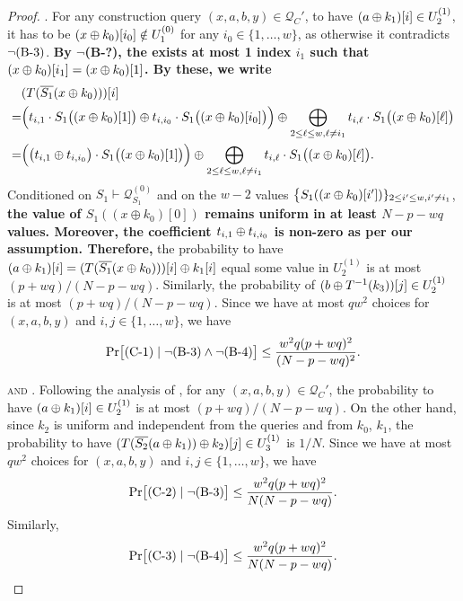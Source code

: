 \begin{proof}
\noindent \textsc{\cone}. For any construction query $(x,a,b,y)\in\mathcal{Q}_C'$, to have $(a\oplus k_1)[i]\in U_2^{(1)}$, it has to be $(x\oplus k_0)[i_0]\notin U_1^{(0)}$ for any $i_0\in\{1,\ldots,w\}$, as otherwise it contradicts $\neg\text{(B-3)}$. \textbf{By $\neg$(B-?), the exists at most 1 index $i_1$ such that $(x\oplus k_0)[i_1]=(x\oplus k_0)[1]$. By these, we write}
%
\begin{align*}
& (T(\overline{S_1}(x\oplus k_0)))[i]       \\
= &
\Big(t_{i,1}\cdot S_1\big((x\oplus k_0)[1]\big)
\oplus
t_{i,i_0}\cdot S_1\big((x\oplus k_0)[i_0]\big)\Big)
\oplus
\bigoplus_{2\leq\ell\leq w,\ell\neq i_1}t_{i,\ell}\cdot S_1\big((x\oplus k_0)[\ell]\big)     \\
= &
\Big(\big(t_{i,1}\oplus t_{i,i_0}\big)\cdot S_1\big((x\oplus k_0)[1]\big)\Big)
\oplus
\bigoplus_{2\leq\ell\leq w,\ell\neq i_1}t_{i,\ell}\cdot S_1\big((x\oplus k_0)[\ell]\big)    .
\end{align*}
%
Conditioned on $S_1\vdash\mathcal{Q}_{S_1}^{(0)}$ and on the $w-2$ values $\big\{S_1((x\oplus k_0)[i'])\}_{2\leq i'\leq w,i'\neq i_1}$, \textbf{the value of $S_1((x \oplus k_0)[0])$ remains uniform in at least $N-p-wq$ values. Moreover, the coefficient $t_{i,1}\oplus t_{i,i_0}$ is non-zero as per our assumption. Therefore,} the probability to have $(a\oplus k_1)[i]=(T(\overline{S_1}(x\oplus k_0)))[i]\oplus k_1[i]$ equal some value in $U_2^{(1)}$ is at most $(p+wq)/(N-p-wq)$. Similarly, the probability of $(b\oplus T^{-1}(k_3))[j]\in U_2^{(1)}$ is at most $(p+wq)/(N-p-wq)$. Since we have at most $qw^2$ choices for $(x,a,b,y)$ and $i, j \in\{1, \ldots, w\}$, we have
%
$$
{\Pr}\big[\text{(C-1)}\mid\neg\text{(B-3)}\wedge\neg\text{(B-4)}\big] \leq \frac{w^{2} q (p+w q)^{2}}{(N-p-wq)^{2}}.
$$




\noindent \textsc{\ctwo and \cthree}. Following the analysis of \cone, for any $(x,a,b,y)\in\mathcal{Q}_C'$, the probability to have $(a\oplus k_1)[i]\in U_{2}^{(1)}$ is at most $(p+wq)/(N-p-wq)$. On the other hand, since $k_{2}$ is uniform and independent from the queries and from $k_{0}$, $k_{1}$, the probability to have $(T(\overline{S_2}(a \oplus k_1))\oplus k_2)[j]\in U_{3}^{(1)}$ is $1/N$. Since we have at most $qw^2$ choices for $(x,a,b,y)$ and $i, j \in\{1, \ldots, w\}$, we have
%
%
$$
{\Pr}\big[\text{(C-2)}\mid\neg\text{(B-3)}\big] \leq \frac{w^{2} q (p+w q)^{2}}{N  (N-p-wq)}.
$$
%
Similarly,
%
$$
{\Pr}\big[\text{(C-3)}\mid\neg\text{(B-4)}\big] \leq \frac{w^{2} q (p+w q)^{2}}{N  (N-p-wq)}.
$$





\end{proof}
